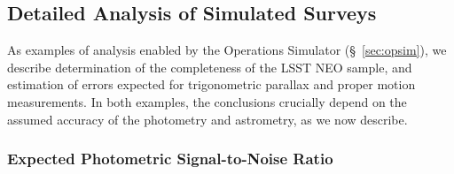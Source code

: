 \subsection{  Detailed Analysis of Simulated Surveys  }

As examples of analysis enabled by the Operations Simulator
(\S~\ref{sec:opsim}), we describe
determination of the completeness of the LSST NEO sample, and estimation
of errors expected for trigonometric parallax and proper motion measurements.
In both examples, the conclusions crucially depend on the assumed
accuracy of the photometry and astrometry, as we now describe.

\subsubsection{  Expected Photometric Signal-to-Noise Ratio }

